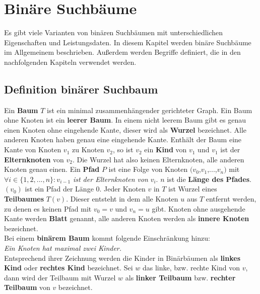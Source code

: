 \documentclass[a4paper,12pt]{article}
\begin{document}
\newpage
\section {Binäre Suchbäume}
Es gibt viele Varianten von binären Suchbäumen mit unterschiedlichen Eigenschaften und Leistungsdaten. In diesem Kapitel werden binäre Suchbäume im Allgemeinem beschrieben. Außerdem werden Begriffe definiert, die in den nachfolgenden Kapiteln verwendet werden. \\
\subsection{Definition binärer Suchbaum}
Ein \textbf{Baum} $T$ ist ein minimal zusammenhängender gerichteter Graph. Ein Baum ohne Knoten ist ein \textbf{leerer Baum}. In einem nicht leerem Baum gibt es genau einen Knoten ohne eingehende Kante, dieser wird als \textbf{Wurzel}  bezeichnet. Alle anderen Knoten haben genau eine eingehende Kante.  Enthält der Baum eine Kante von Knoten $v_1$ zu Knoten $v_2$, so ist $v_2$ ein \textbf{Kind} von $v_1$ und $v_1$ ist der  \textbf{Elternknoten} von $v_2$. Die Wurzel hat also keinen Elternknoten, alle anderen Knoten genau einen.  Ein \textbf{Pfad} $P$ ist eine Folge von Knoten $(v_0$,$v_1$,...,$v_n)$ mit $\forall i \in \{ 1, 2,..., n \} \colon v_{i-1}$ \textit{ist der Elternknoten von} $v_i$. $n$ ist die \textbf{Länge des Pfades}. $\left(v_0\right)$ ist ein Pfad der Länge $0$. Jeder Knoten $v$ in $T$ ist Wurzel eines \textbf{Teilbaumes} $T(v)$. Dieser entsteht in dem alle Knoten $u$ aus $T$ entfernt werden, zu denen es keinen Pfad mit  $v_0 = v$ und $v_n = u$ gibt. Knoten ohne ausgehende Kante werden \textbf{Blatt} genannt, alle anderen Knoten werden als \textbf{innere Knoten} bezeichnet.\\
Bei einem \textbf{binärem Baum} kommt folgende Einschränkung hinzu:  \\
\textit{Ein Knoten hat maximal zwei Kinder.}\\ 
Entsprechend ihrer Zeichnung werden die Kinder in Binärbäumen als \textbf{linkes Kind} oder \textbf{rechtes Kind} bezeichnet. Sei $w$ das linke, bzw. rechte Kind von $v$, dann wird der Teilbaum mit Wurzel $w$ als \textbf{linker Teilbaum} bzw. \textbf{rechter Teilbaum}  von $v$ bezeichnet.  
\end{document}

